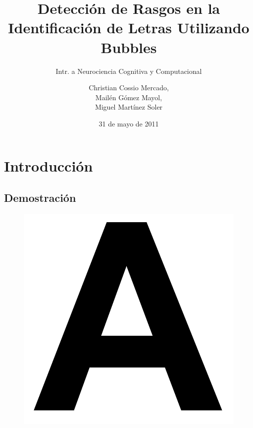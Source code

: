 \documentclass{beamer}
\title[Identificaci\'on de Letras Utilizando Bubbles]{Detecci\'on de Rasgos en la Identificaci\'on de Letras Utilizando Bubbles}
\subtitle{Intr. a Neurociencia Cognitiva y Computacional}
\author[Mart\'inez Soler,\\G\'omez Mayol,\\Cossio Mercado]{Christian Cossio Mercado,\\Mail\'en G\'omez Mayol,\\Miguel Mart\'inez Soler}
\institute{Departamento de Computaci\'on - FCEyN, UBA}
\date{31 de mayo de 2011}
\begin{document}
\begin{frame}
\titlepage
\end{frame}

\section{Introducci\'on}
  \subsection{Demostraci\'on}

      \begin{frame}
      \begin{figure}
	\includegraphics[scale=.2]{graficos/letra.png}
      \end{figure}
      \end{frame}
\end{document}
